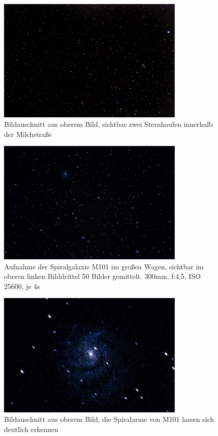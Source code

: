\begin{figure}
\centering
\includegraphics[width=0.8\textwidth]{figs/astro/Haufen_crop1.jpg}
\caption{Bildauschnitt aus oberem Bild, sichtbar zwei Sternhaufen innerhalb der Milchstraße}
\end{figure}


\begin{figure}
\centering
\includegraphics[width=0.8\textwidth]{figs/astro/m101_crop.jpg}
\caption{Aufnahme der Spiralgalaxie M101 im großen Wagen, sichtbar im oberen linken Bilddrittel 50 Bilder gemittelt. 300mm, f:4,5, ISO 25600, je 4s}
\end{figure}


\begin{figure}
\centering
\includegraphics[width=0.8\textwidth]{figs/astro/m101_add_50.jpg}
\caption{Bildauschnitt aus oberem Bild, die Spiralarme von M101 lassen sich deutlich erkennen}
\end{figure}



